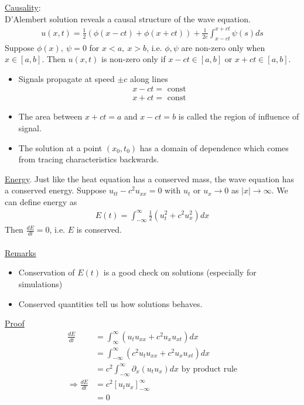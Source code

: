\documentclass[12pt, letterpaper]{article}
\begin{document}
\underline{Causality}: \\
D'Alembert solution reveals a causal structure of the wave equation.
\begin{align*}
    u(x,t) = \frac 12 (\phi(x-ct)+\phi(x+ct)) + \frac{1}{2c} \int_{x-ct}^{x+ct} \psi(s)ds
\end{align*}
Suppose $\phi(x),\ \psi = 0$ for $x < a,\ x > b$, i.e. $\phi,\psi$ are non-zero only when 
$x \in [a,b]$. Then $u(x,t)$ is non-zero only if $x-ct\in[a,b]$ or $x+ct \in [a,b]$.
\begin{itemize}
    \item Signals propagate at speed $\pm c$ along lines
    \begin{align*}
        x - ct = \text{ const} \\
        x + ct = \text{ const}
    \end{align*}
    \item The area between $x+ct = a$ and $x-ct = b$ is called the region of influence of signal.
    \item The solution at a point $(x_0,t_0)$ has a domain of dependence which comes from 
    tracing characteristics backwards.
\end{itemize}
\underline{Energy}.
Just like the heat equation has a conserved mass, the wave equation has a conserved 
energy. Suppose $u_{tt} - c^2u_{xx} = 0$ with $u_t$ or $u_x \rightarrow 0$ as $|x| \rightarrow \infty$.
We can define energy as 
\begin{align*}
    E(t) = \int_{-\infty}^{\infty} \frac{1}{2}(u_t^2 + c^2u_x^2)dx
\end{align*}
Then $\frac{dE}{dt} = 0$, i.e. $E$ is conserved. \\ \\
\underline{Remarks}
\begin{itemize}
    \item Conservation of $E(t)$ is a good check on solutions (especially for simulations)
    \item Conserved quantities tell us how solutions behaves.
\end{itemize}
\underline{Proof}
\begin{align*}
    \frac{dE}{dt} &= \int_{\infty}^{\infty} (u_tu_{xx}+c^2u_xu_{xt})dx \\
    &= \int_{-\infty}^{\infty} (c^2u_tu_{xx} + c^2u_xu_{xt})dx \\
    &= c^2 \int_{-\infty}^{\infty} \partial_x(u_tu_x)dx \text{ by product rule} \\
    \Rightarrow \frac{dE}{dt} &= c^2[u_tu_x]^\infty_{-\infty} \\
    &= 0
\end{align*}
\end{document}
